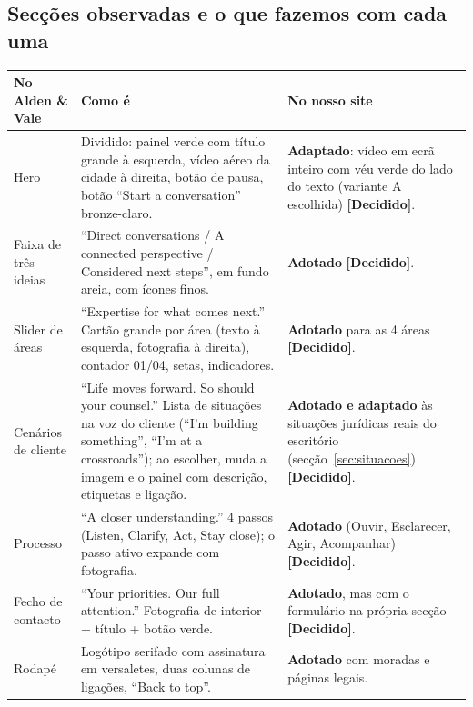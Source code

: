 \documentclass[11pt,a4paper]{article}
\newcommand{\decidido}{\textcolor{verde700}{\textbf{[Decidido]}}}
\begin{document}
\subsection{Secções observadas e o que fazemos com cada uma}
\begin{longtable}{p{4.2cm}p{5.6cm}p{5cm}}
\toprule
\textbf{No Alden \& Vale} & \textbf{Como é} & \textbf{No nosso site} \\
\midrule
\endhead
Hero & Dividido: painel verde com título grande à esquerda, vídeo aéreo da cidade à direita, botão de pausa, botão ``Start a conversation'' bronze-claro. &
\textbf{Adaptado}: vídeo em ecrã inteiro com véu verde do lado do texto (variante A escolhida) \decidido. \\
Faixa de três ideias & ``Direct conversations / A connected perspective / Considered next steps'', em fundo areia, com ícones finos. & \textbf{Adotado} \decidido. \\
Slider de áreas & ``Expertise for what comes next.'' Cartão grande por área (texto à esquerda, fotografia à direita), contador 01/04, setas, indicadores. & \textbf{Adotado} para as 4 áreas \decidido. \\
Cenários de cliente & ``Life moves forward. So should your counsel.'' Lista de situações na voz do cliente (``I'm building something'', ``I'm at a crossroads''); ao escolher, muda a imagem e o painel com descrição, etiquetas e ligação. & \textbf{Adotado e adaptado} às situações jurídicas reais do escritório (secção~\ref{sec:situacoes}) \decidido. \\
Processo & ``A closer understanding.'' 4 passos (Listen, Clarify, Act, Stay close); o passo ativo expande com fotografia. & \textbf{Adotado} (Ouvir, Esclarecer, Agir, Acompanhar) \decidido. \\
Fecho de contacto & ``Your priorities. Our full attention.'' Fotografia de interior + título + botão verde. & \textbf{Adotado}, mas com o formulário na própria secção \decidido. \\
Rodapé & Logótipo serifado com assinatura em versaletes, duas colunas de ligações, ``Back to top''. & \textbf{Adotado} com moradas e páginas legais. \\
\bottomrule
\end{longtable}
\end{document}

